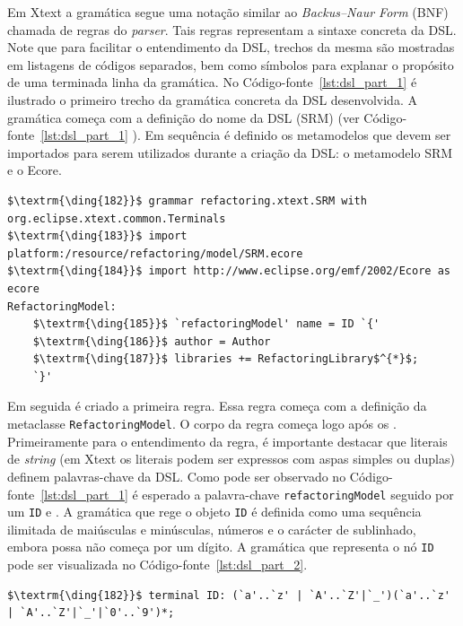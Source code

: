 Em Xtext a gramática segue uma notação similar ao \textit{Backus–Naur Form} (BNF) chamada de regras do \textit{parser}. Tais regras representam a sintaxe concreta da DSL. Note que para facilitar o entendimento da DSL, trechos da mesma são mostradas em listagens de códigos separados, bem como símbolos para explanar o propósito de uma terminada linha da gramática. No Código-fonte~\ref{lst:dsl_part_1} é ilustrado o primeiro trecho da gramática concreta da DSL desenvolvida. A gramática começa com a definição do nome da DSL (SRM) (ver Código-fonte~\ref{lst:dsl_part_1} ). Em sequência é definido os metamodelos que devem ser importados para serem utilizados durante a criação da DSL: o metamodelo SRM e o Ecore.


\begin{lstlisting}[language=Xtext, frame=single, basicstyle={\scriptsize}, mathescape=true, label={lst:dsl_part_1}, caption={Gramática da DSL - parte 1}]
$\textrm{\ding{182}}$ grammar refactoring.xtext.SRM with org.eclipse.xtext.common.Terminals 
$\textrm{\ding{183}}$ import platform:/resource/refactoring/model/SRM.ecore
$\textrm{\ding{184}}$ import http://www.eclipse.org/emf/2002/Ecore as ecore
RefactoringModel: 
	$\textrm{\ding{185}}$ `refactoringModel' name = ID `{'
	$\textrm{\ding{186}}$ author = Author
	$\textrm{\ding{187}}$ libraries += RefactoringLibrary$^{*}$;
	`}'
\end{lstlisting}


Em seguida é criado a primeira regra. Essa regra começa com a definição da metaclasse \texttt{RefactoringModel}. O corpo da regra começa logo após os \aspas{\texttt{:}}. Primeiramente para o entendimento da regra, é importante destacar que literais de \textit{string} (em Xtext os literais podem ser expressos com aspas simples ou duplas) definem palavras-chave da DSL. Como pode ser observado no Código-fonte~\ref{lst:dsl_part_1} é esperado a palavra-chave \texttt{refactoringModel} seguido por um \texttt{ID} e \aspas{\{}. A gramática que rege o objeto \texttt{ID} é definida como uma sequência ilimitada de maiúsculas e minúsculas, números e o carácter de sublinhado, embora possa não começa por um dígito. A gramática que representa o nó \texttt{ID} pode ser visualizada no Código-fonte~\ref{lst:dsl_part_2}. 

\begin{lstlisting}[language=Xtext, frame=single, basicstyle=\scriptsize, mathescape=true, label={lst:dsl_part_2}, caption={Gramática da DSL - parte 2}]
	$\textrm{\ding{182}}$ terminal ID: (`a'..`z' | `A'..`Z'|`_')(`a'..`z' | `A'..`Z'|`_'|`0'..`9')*;
\end{lstlisting}

